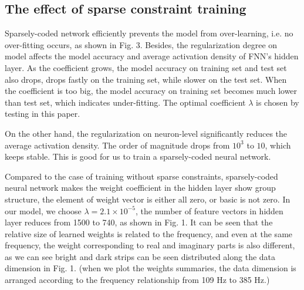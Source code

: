 \subsection{The effect of sparse constraint training}
Sparsely-coded network efficiently prevents the model from over-learning, i.e. no over-fitting occurs, as shown in Fig. 3.
Besides, the regularization degree on model affects the model accuracy and average activation density of FNN's hidden layer. As the coefficient grows, the model accuracy on training set and test set also drops, drops fastly on the training set, while slower on the test set. When the coefficient is too big, the model accuracy on training set becomes much lower than test set, which indicates under-fitting.
The optimal coefficient $\lambda$ is chosen by testing in this paper.

On the other hand, the regularization on neuron-level significantly reduces the average activation density.
The order of magnitude drops from $10^{3}$ to $10$, which keeps stable. This is good for us to train a sparsely-coded neural network.

Compared to the case of training without sparse constraints, sparsely-coded neural network makes the weight coefficient in the hidden layer show group structure, the element of weight vector is either all zero, or basic is not zero.
In our model, we choose $\lambda=2.1 \times 10^{-5} $, the number of feature vectors in hidden layer reduces from 1500 to 740, as shown in Fig. 1. It can be seen that the relative size of learned weights is related to the frequency, and even at the same frequency, the weight corresponding
to real and imaginary parts is also different, as we can see bright and dark strips can be seen distributed along the data dimension in Fig. 1. (when we plot the weights summaries, the data dimension is arranged according to the frequency relationship from 109 Hz to 385 Hz.)

